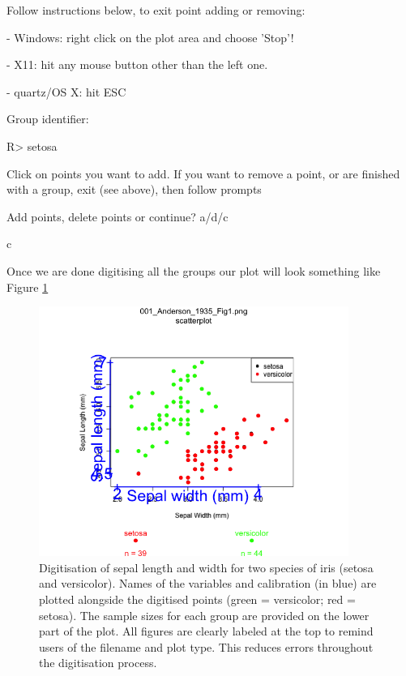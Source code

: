 \documentclass[article]{jss}
\begin{document}
\begin{CodeChunk}
\begin{CodeOutput}
Follow instructions below, to exit point adding or removing:

 - Windows: right click on the plot area and choose 'Stop'!

 - X11: hit any mouse button other than the left one.

 - quartz/OS X: hit ESC

Group identifier:
\end{CodeOutput}
\begin{CodeInput}
R> setosa
\end{CodeInput}
\begin{CodeOutput}
Click on points you want to add.
If you want to remove a point, or are finished with a
group, exit (see above), then follow prompts

Add points, delete points or continue? a/d/c 
\end{CodeOutput}
\begin{CodeInput}
c
\end{CodeInput}
\end{CodeChunk}

Once we are done digitising all the groups our plot will look something like Figure \ref{fig:scatter_extract}

\begin{figure}[!h] 
 \includegraphics[width=0.9\textwidth]{001_Anderson_1935_Fig1_digitised.png} 
 \caption{Digitisation of sepal length and width for two species of iris (setosa and versicolor). Names of the variables and calibration (in blue) are plotted alongside the digitised points (green = versicolor; red = setosa). The sample sizes for each group are provided on the lower part of the plot. All figures are clearly labeled at the top to remind users of the filename and plot type. This reduces errors throughout the digitisation process.}
\label{fig:scatter_extract}
\end{figure}
\end{document}
